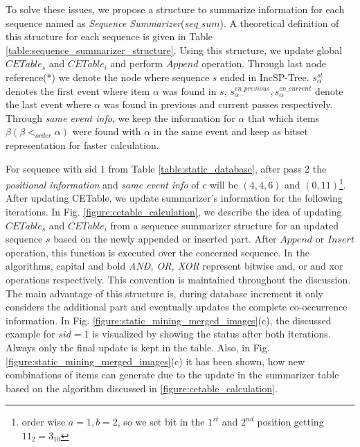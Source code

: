 To solve these issues, we propose a structure to summarize information for each sequence named as \textit{Sequence Summarizer}($seq\_sum$). A theoretical definition of this structure for each sequence is given in Table \ref{table:sequence_summarizer_structure}. Using this structure, we update global $CETable_{s}$ and $CETable_{i}$ and perform $Append$ operation. Through last node reference(*) we denote the node where sequence $s$ ended in IncSP-Tree. $s_{\alpha}^{st}$ denotes the first event where item $\alpha$ was found in $s$, $s_{\alpha}^{en\_previous},s_{\alpha}^{en\_current}$ denote the last event where $\alpha$ was found in previous and current passes respectively. Through \textit{same event info}, we keep the information for $\alpha$ that which items $\beta(\beta <_{order} \alpha)$ were found with $\alpha$ in the same event and keep as bitset representation for faster calculation. 

For sequence with sid $1$ from Table \ref{table:static_database}, after pass 2 the \textit{positional information} and \textit{same event info} of $c$ will be $(4,4,6)$ and $(0,11)$\footnote{order wise $a=1,b=2$, so we set bit in the $1^{st}$ and $2^{nd}$ position getting $11_{2}=3_{10}$}. After updating CETable, we update summarizer's information for the following iterations. In Fig. \ref{figure:cetable_calculation}, we describe the idea of updating $CETable_{s}$ and $CETable_{i}$ from a sequence summarizer structure for an updated sequence $s$ based on the newly appended or inserted part. After $Append$ or $Insert$ operation, this function is executed over the concerned sequence. In the algorithms, capital and bold \textit{AND, OR, XOR} represent bitwise and, or and xor operations respectively. This convention is maintained throughout the discussion. The main advantage of this structure is, during database increment it only considers the additional part and eventually updates the complete co-occurrence information. In Fig. \ref{figure:static_mining_merged_images}(c), the discussed example for $sid=1$ is visualized by showing the status after both iterations. Always only the final update is kept in the table. Also, in Fig. \ref{figure:static_mining_merged_images}(c) it has been shown, how new combinations of items can generate due to the update in the summarizer table based on the algorithm discussed in \ref{figure:cetable_calculation}.


